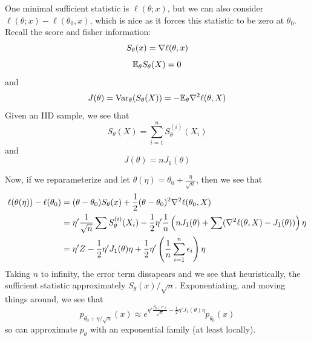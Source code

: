 
One minimal sufficient statistic is $\ell(\theta; x)$, but we can also consider $\ell(\theta; x) - \ell(\theta_0, x)$, which is nice as it forces this statistic to be zero at $\theta_0$.\\

Recall the score and fisher information:
\[ S_{\theta}(x) = \nabla \ell(\theta, x) \]
\[ \mathbb{E}_{\theta} S_{\theta}(X) = 0 \]
and
\[ J(\theta) = \text{Var}_{\theta}(S_{\theta}(X)) = -\mathbb{E}_{\theta} \nabla^2 \ell(\theta, X) \]
Given an IID sample, we see that
\[ S_{\theta}(X) = \sum_{i = 1}^{n} S_{\theta}^{(i)}(X_i) \]
and
\[ J(\theta) = nJ_{1}(\theta) \]

Now, if we reparameterize and let $\theta(\eta) = \theta_0 + \frac{\eta}{\sqrt{n}}$, then we see that
\begin{align*}
    \ell(\theta(\eta)) - \ell(\theta_0) &= (\theta - \theta_0)S_{\theta}(x) + \frac{1}{2}(\theta - \theta_0)^2 \nabla^2 \ell(\theta_0, X)\\
    &= \eta' \frac{1}{\sqrt{n}}\sum S_{\theta}^{(i)}(X_i) - \frac{1}{2}\eta' \frac{1}{n}\left(nJ_1(\theta) + \sum (\nabla^2 \ell(\theta, X) - J_{1}(\theta))\right)\eta\\
    &= \eta' Z - \frac{1}{2}\eta' J_1(\theta)\eta + \frac{1}{2}\eta'\left(\frac{1}{n}\sum_{i = 1}^{n} \epsilon_i\right)\eta
\end{align*}
Taking $n$ to infinity, the error term dissapears and we see that heuristically, the sufficient statistic approximately $S_{\theta}(x)/\sqrt{n}$. Exponentiating, and moving things around, we see that
\[ p_{\theta_0 + \eta/\sqrt{n}}(x) \approx e^{\eta'\frac{S_{\theta}(x)}{\sqrt{n}} - \frac{1}{2}\eta'J_1(\theta)\eta}p_{\theta_0}(x) \]
so can approximate $p_{\theta}$ with an exponential family (at least locally).

